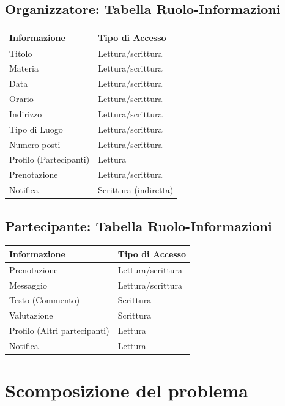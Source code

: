\documentclass[12pt,a4paper]{report}
\begin{document}
\subsection{Organizzatore: Tabella Ruolo-Informazioni}
\begin{tabularx}{\textwidth}{|X|X|}
    \hline
    \rowcolor{studyColor} \textbf{Informazione} & \textbf{Tipo di Accesso} \\ \hline
    \endhead
    Titolo & Lettura/scrittura \\ \hline
    Materia & Lettura/scrittura \\ \hline
    Data & Lettura/scrittura \\ \hline
    Orario & Lettura/scrittura \\ \hline
    Indirizzo & Lettura/scrittura \\ \hline
    Tipo di Luogo & Lettura/scrittura \\ \hline
    Numero posti & Lettura/scrittura \\ \hline
    Profilo (Partecipanti) & Lettura \\ \hline
    Prenotazione & Lettura/scrittura \\ \hline
    Notifica & Scrittura (indiretta) \\ \hline
\end{tabularx}

\subsection{Partecipante: Tabella Ruolo-Informazioni}
\begin{tabularx}{\textwidth}{|X|X|}
    \hline
    \rowcolor{studyColor} \textbf{Informazione} & \textbf{Tipo di Accesso} \\ \hline
    \endhead
    Prenotazione & Lettura/scrittura \\ \hline
    Messaggio & Lettura/scrittura \\ \hline
    Testo (Commento) & Scrittura \\ \hline
    Valutazione & Scrittura \\ \hline
    Profilo (Altri partecipanti) & Lettura \\ \hline
    Notifica & Lettura \\ \hline
\end{tabularx}

\newpage
\section{Scomposizione del problema}
\end{document}
